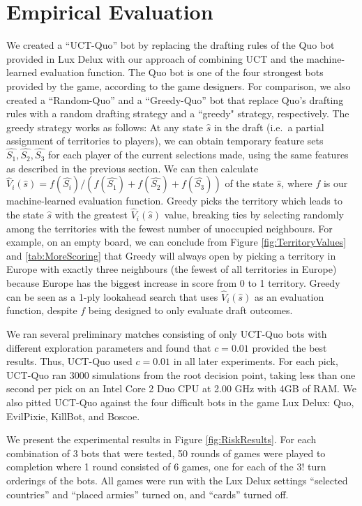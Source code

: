 \documentclass[letterpaper]{article}
\numberwithin{equation}{section}
\numberwithin{theorem}{section}
\numberwithin{lemma}{section}
\numberwithin{df}{section}
\begin{document}
\section{Empirical Evaluation}


We created a ``UCT-Quo'' bot by replacing the drafting rules of the Quo bot provided in Lux Delux with our approach of combining UCT and the machine-learned evaluation function.  The Quo bot is one of the four strongest bots provided by the game, according to the game designers.  For comparison, we also created a ``Random-Quo'' and a ``Greedy-Quo'' bot that replace Quo's drafting rules with a random drafting strategy and a ``greedy" strategy, respectively.  The greedy strategy works as follows: At any state $\hat{s}$ in the draft (i.e.~a partial assignment of territories to players), we can obtain temporary feature sets $\hat{S_1}, \hat{S_2}, \hat{S_3}$ for each player of the current selections made, using the same features as described in the previous section.  We can then calculate $\hat{V}_i(\hat{s}) = f(\hat{S_i}) / (f(\hat{S_1}) + f(\hat{S_2}) + f(\hat{S_3}))$ of the state $\hat{s}$, where $f$ is our machine-learned evaluation function.  Greedy picks the territory which leads to the state $\hat{s}$ with the greatest $\hat{V}_i(\hat{s})$ value, breaking ties by selecting randomly among the territories with the fewest number of unoccupied neighbours.  For example, on an empty board, we can conclude from Figure \ref{fig:TerritoryValues} and \ref{tab:MoreScoring} that Greedy will always open by picking a territory in Europe with exactly three neighbours (the fewest of all territories in Europe) because Europe has the biggest increase in score from 0 to 1 territory.  
Greedy can be seen as a 1-ply lookahead search that uses $\hat{V}_i(\hat{s})$ as an evaluation function, despite $f$ being designed to only evaluate draft outcomes.  

We ran several preliminary matches consisting of only UCT-Quo bots with different exploration parameters and found that $c=0.01$ provided the best results.  Thus, UCT-Quo used $c=0.01$ in all later experiments.  For each pick, UCT-Quo ran $3000$ simulations from the root decision point, taking less than one second per pick on an Intel Core 2 Duo CPU at 2.00 GHz with 4GB of RAM.  We also pitted UCT-Quo against the four difficult bots in the game Lux Delux: Quo, EvilPixie, KillBot, and Boscoe.

We present the experimental results in Figure \ref{fig:RiskResults}.  For each combination of 3 bots that were tested, 50 rounds of games were played to completion where 1 round consisted of 6 games, one for each of the $3!$ turn orderings of the bots.  All games were run with the Lux Delux settings ``selected countries'' and ``placed armies'' turned on, and ``cards'' turned off.  
\end{document}
